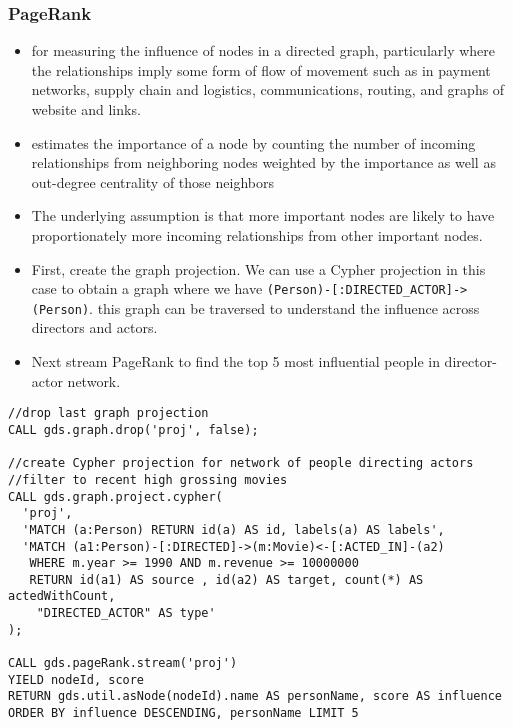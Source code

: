 \begin{frame}[fragile]\frametitle{PageRank}


\begin{itemize}
\item  for measuring the influence of nodes in a directed graph, particularly where the relationships imply some form of flow of movement such as in payment networks, supply chain and logistics, communications, routing, and graphs of website and links.
\item estimates the importance of a node by counting the number of incoming relationships from neighboring nodes weighted by the importance as well as out-degree centrality of those neighbors
\item The underlying assumption is that more important nodes are likely to have proportionately more incoming relationships from other important nodes.
\item First, create the graph projection. We can use a Cypher projection in this case to obtain a graph where we have \lstinline|(Person)-[:DIRECTED_ACTOR]->(Person)|. this graph can be traversed to understand the influence across directors and actors.
\item Next stream PageRank to find the top 5 most influential people in director-actor network.
\end{itemize}

\begin{lstlisting}
//drop last graph projection
CALL gds.graph.drop('proj', false);

//create Cypher projection for network of people directing actors
//filter to recent high grossing movies
CALL gds.graph.project.cypher(
  'proj',
  'MATCH (a:Person) RETURN id(a) AS id, labels(a) AS labels',
  'MATCH (a1:Person)-[:DIRECTED]->(m:Movie)<-[:ACTED_IN]-(a2)
   WHERE m.year >= 1990 AND m.revenue >= 10000000
   RETURN id(a1) AS source , id(a2) AS target, count(*) AS actedWithCount,
    "DIRECTED_ACTOR" AS type'
);

CALL gds.pageRank.stream('proj')
YIELD nodeId, score
RETURN gds.util.asNode(nodeId).name AS personName, score AS influence
ORDER BY influence DESCENDING, personName LIMIT 5

\end{lstlisting}

\end{frame}


